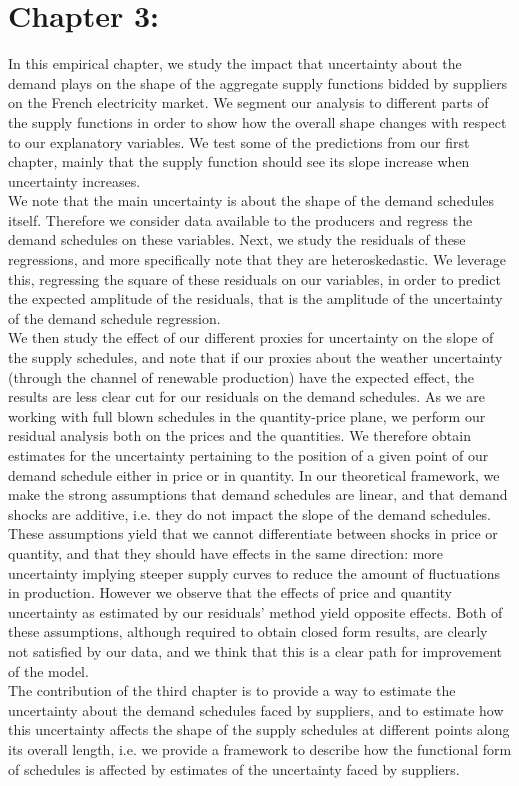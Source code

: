 \section*{Chapter 3: }

In this empirical chapter, we study the impact that uncertainty about the demand plays on the shape of the aggregate supply functions bidded by suppliers on the French electricity market. We segment our analysis to different parts of the supply functions in order to show how the overall shape changes with respect to our explanatory variables. We test some of the predictions from our first chapter, mainly that the supply function should see its slope increase when uncertainty increases. \\

We note that the main uncertainty is about the shape of the demand schedules itself. Therefore we consider data available to the producers and regress the demand schedules on these variables. Next, we study the residuals of these regressions, and more specifically note that they are heteroskedastic. We leverage this, regressing the square of these residuals on our variables, in order to predict the expected amplitude of the residuals, that is the amplitude of the uncertainty of the demand schedule regression.\\

We then study the effect of our different proxies for uncertainty on the slope of the supply schedules, and note that if our proxies about the weather uncertainty (through the channel of renewable production) have the expected effect, the results are less clear cut for our residuals on the demand schedules. As we are working with full blown schedules in the quantity-price plane, we perform our residual analysis both on the prices and the quantities. We therefore obtain estimates for the uncertainty pertaining to the position of a given point of our demand schedule either in price or in quantity. In our theoretical framework, we make the strong assumptions that demand schedules are linear, and that demand shocks are additive, i.e. they do not impact the slope of the demand schedules. These assumptions yield that we cannot differentiate between shocks in price or quantity, and that they should have effects in the same direction: more uncertainty implying steeper supply curves to reduce the amount of fluctuations in production. However we observe that the effects of price and quantity uncertainty as estimated by our residuals' method yield opposite effects. Both of these assumptions, although required to obtain closed form results, are clearly not satisfied by our data, and we think that this is a clear path for improvement of the model.  \\

The contribution of the third chapter is to provide a way to estimate the uncertainty about the demand schedules faced by suppliers, and to estimate how this uncertainty affects the shape of the supply schedules at different points along its overall length, i.e. we provide a framework to describe how the functional form of schedules is affected by estimates of the uncertainty faced by suppliers.\\